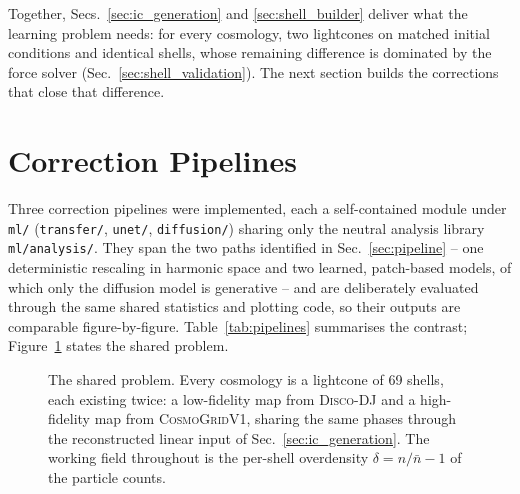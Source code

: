 \documentclass{report}
\begin{document}
Together, Secs.~\ref{sec:ic_generation} and \ref{sec:shell_builder} deliver what the learning problem needs: for every cosmology, two lightcones on matched initial conditions and identical shells, whose remaining difference is dominated by the force solver (Sec.~\ref{sec:shell_validation}). The next section builds the corrections that close that difference.

\clearpage
\section{Correction Pipelines}
\label{sec:correction-pipelines}

Three correction pipelines were implemented, each a self-contained module under \texttt{ml/} (\texttt{transfer/}, \texttt{unet/}, \texttt{diffusion/}) sharing only the neutral analysis library \texttt{ml/analysis/}. They span the two paths identified in Sec.~\ref{sec:pipeline} -- one deterministic rescaling in harmonic space and two learned, patch-based models, of which only the diffusion model is generative -- and are deliberately evaluated through the same shared statistics and plotting code, so their outputs are comparable figure-by-figure. Table~\ref{tab:pipelines} summarises the contrast; Figure~\ref{fig:shared_problem} states the shared problem.

\begin{figure}[h!]
\centering
{}
\caption{The shared problem. Every cosmology is a lightcone of 69 shells, each existing twice: a low-fidelity map from \textsc{Disco-DJ} and a high-fidelity map from \textsc{CosmoGridV1}, sharing the same phases through the reconstructed linear input of Sec.~\ref{sec:ic_generation}. The working field throughout is the per-shell overdensity $\delta = n/\bar n - 1$ of the particle counts.}
\label{fig:shared_problem}
\end{figure}
\end{document}

